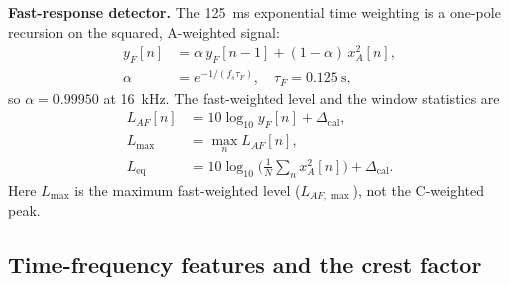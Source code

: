 \documentclass[conference]{IEEEtran}
\newcommand{\Leq}{L_{\text{eq}}}
\newcommand{\Lmax}{L_{\max}}
\begin{document}
\textbf{Fast-response detector.} The 125~ms exponential time weighting is a one-pole recursion on the squared, A-weighted signal:
\begin{equation}
\begin{split}
y_F[n]&=\alpha\,y_F[n-1]+(1-\alpha)\,x_A^{2}[n],\\
\alpha&=e^{-1/(f_s\tau_F)},\quad \tau_F=0.125~\text{s},
\end{split}
\label{eq:fast}
\end{equation}
so $\alpha = 0.99950$ at 16~kHz. The fast-weighted level and the window statistics are
\begin{equation}
\begin{split}
L_{AF}[n]&=10\log_{10}y_F[n]+\Delta_{\text{cal}},\\
\Lmax&=\max_{n}L_{AF}[n],\\
\Leq&=10\log_{10}\!\Big(\tfrac1N\sum_{n}x_A^{2}[n]\Big)+\Delta_{\text{cal}}.
\end{split}
\label{eq:stats}
\end{equation}
Here $\Lmax$ is the maximum fast-weighted level ($L_{AF,\max}$), not the C-weighted peak.

\subsection{Time-frequency features and the crest factor}
\end{document}
